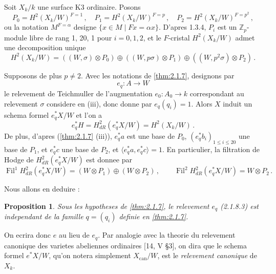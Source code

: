 \documentclass[12pt,a4paper]{article}
\theoremstyle{plain}
\newtheorem{proposition}[theorem]{Proposition}
\theoremstyle{definition}
\theoremstyle{remark}
\DeclareMathOperator{\Fil}{Fil}
\begin{document}
\paragraph{}

Soit $X_k/k$ une surface K3 ordinaire. Posons
\begin{equation}\label{eq:2.1.8.1}
P_0 = H^2(X_k/W)^{F=1}\,, \quad P_1 = H^2(X_k/W)^{F=p}\,, \quad P_2 = H^2(X_k/W)^{F=p^2}\,,
\end{equation}
ou la notation $M^{F=\alpha}$ designe $\{x \in M \mid Fx = \alpha x\}$. D'apres 1.3.4, $P_i$ est un $\mathbb{Z}_p$-module libre de rang 1, 20, 1 pour $i = 0, 1, 2$, et le $F$-cristal $H^2(X_k/W)$ admet une decomposition unique
\begin{equation}\label{eq:2.1.8.2}
H^2(X_k/W) = ((W, \sigma) \otimes P_0) \oplus ((W, p\sigma) \otimes P_1) \oplus ((W, p^2\sigma) \otimes P_2)\,.\end{equation}

Supposons de plus $p \neq 2$. Avec les notations de \ref{thm:2.1.7}, designons par
\begin{equation}\label{eq:2.1.8.3}
e_q : A \longrightarrow W
\end{equation}
le relevement de Teichmuller de l'augmentation $e_0 : A_0 \to k$ correspondant au relevement $\sigma$ considere en (iii), donc donne par $e_q(q_i) = 1$.
Alors $X$ induit un schema formel $e_q^*X/W$ et l'on a
\begin{equation}\label{eq:2.1.8.4}
e_q^*H = H_{dR}^2(e_q^*X/W) = H^2(X_k/W)\,.\end{equation}
De plus, d'apres (\ref{thm:2.1.7} (iii)), $e_q^*a$ est une base de $P_0$, $(e_q^*b_i)_{1 \leq i \leq 20}$ une base de $P_1$, et $e_q^*c$ une base de $P_2$, et $\langle e_q^*a, e_q^*c\rangle = 1$. En particulier, la filtration de Hodge de $H_{dR}^2(e_q^*X/W)$ est donnee par
\begin{equation}\label{eq:2.1.8.5}
\Fil^1H_{dR}^2(e_q^*X/W) = (W \otimes P_1) \oplus (W \otimes P_2)\,, \qquad \Fil^2H_{dR}^2(e_q^*X/W) = W \otimes P_2\,.\end{equation}

Nous allons en deduire :

\begin{proposition}\label{prop:2.1.9}
Sous les hypotheses de \ref{thm:2.1.7}, le relevement $e_q$ (2.1.8.3) est independant de la famille $q = (q_i)$ definie en \ref{thm:2.1.7}.
\end{proposition}

On ecrira donc $e$ au lieu de $e_q$. Par analogie avec la theorie du relevement canonique des varietes abeliennes ordinaires [14, V \S 3], on dira que le schema formel $e^*X/W$, qu'on notera simplement $X_{\mathrm{can}}/W$, est le \emph{relevement canonique} de $X_k$.
\end{document}
